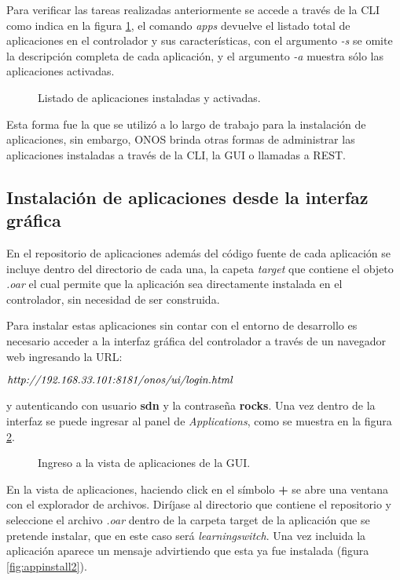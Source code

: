Para verificar las tareas realizadas anteriormente se accede a través de la CLI como indica en la figura \ref{fig:appactivate}, el comando \textit{apps} devuelve el listado total de aplicaciones en el controlador y sus características, con el argumento \textit{-s} se omite la descripción completa de cada aplicación, y el argumento \textit{-a} muestra sólo las aplicaciones activadas.

\begin{figure}[th]
	\centering 
	\caption[Listado de aplicaciones instaladas y activadas]{Listado de aplicaciones instaladas y activadas.}
	\label{fig:appactivate}
\end{figure}

Esta forma fue la que se utilizó a lo largo de trabajo para la instalación de aplicaciones, sin embargo, ONOS brinda otras formas de administrar las aplicaciones instaladas a través de la CLI, la GUI o llamadas a REST.

\subsection{Instalación de aplicaciones desde la interfaz gráfica}
En el repositorio de aplicaciones además del código fuente de cada aplicación se incluye dentro del directorio de cada una, la capeta \textit{target} que contiene el objeto \textit{.oar} el cual permite que la aplicación sea directamente instalada en el controlador, sin necesidad de ser construida.

Para instalar estas aplicaciones sin contar con el entorno de desarrollo es necesario acceder a la interfaz gráfica del controlador a través de un navegador web ingresando la URL:
\begin{center}
    $ \emph {http://192.168.33.101:8181/onos/ui/login.html}$
\end{center}
y autenticando con usuario \textbf{sdn} y la contraseña \textbf{rocks}. Una vez dentro de la interfaz se puede ingresar al panel de \textit{Applications}, como se muestra en la figura \ref{fig:appinstall1}.

\begin{figure}[H]
	\centering 
	\caption[Ingreso a la vista de aplicaciones de la GUI]{Ingreso a la vista de aplicaciones de la GUI.}
	\label{fig:appinstall1}
\end{figure}

En la vista de aplicaciones, haciendo click en el símbolo \textbf{+} se abre una ventana con el explorador de archivos. Diríjase al directorio que contiene el repositorio y seleccione el archivo \textit{.oar} dentro de la carpeta target de la aplicación que se pretende instalar, que en este caso será \textit{learningswitch}. Una vez incluida la aplicación aparece un mensaje advirtiendo que esta ya fue instalada (figura \ref{fig:appinstall2}).


